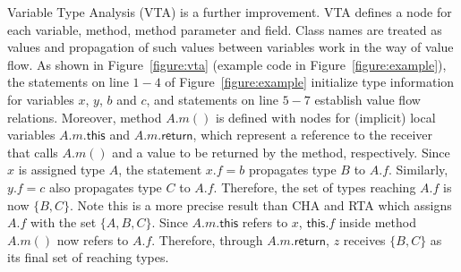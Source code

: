 \documentclass{fac}
\newcommand{\keyword}[1]{\mathsf{#1}}
\newcommand\set[1]{\{#1\}}
\begin{document}
Variable Type Analysis (VTA) is a further improvement. VTA defines a node for each variable, method, method parameter and field. Class names are treated as values and propagation of such values between variables work in the way of value flow.
As shown in Figure~\ref{figure:vta} (example code in Figure~\ref{figure:example}), the statements on line $1-4$ of Figure~\ref{figure:example} initialize type information for variables $x$, $y$, $b$ and $c$, and statements on line $5-7$ establish value flow relations.
Moreover, method $A.m()$ is defined with nodes for (implicit) local variables $A.m.\keyword{this}$ and $A.m.\keyword{return}$, which represent a reference to the receiver that calls $A.m()$ and a value to be returned by the method, respectively.
Since $x$ is assigned type $A$, the statement $x.f=b$ propagates type $B$ to $A.f$. Similarly, $y.f=c$ also propagates type $C$ to $A.f$. Therefore, the set of types reaching $A.f$ is now $\set{B,C}$.
%
Note this is a more precise result than CHA and RTA which assigns $A.f$ with the set $\set{A,B,C}$.
Since $A.m.\keyword{this}$ refers to $x$, $\keyword{this}.f$ inside method $A.m()$ now refers to $A.f$. Therefore, through $A.m.\keyword{return}$, $z$ receives  $\set{B,C}$ as its final set of reaching types.
\end{document}
